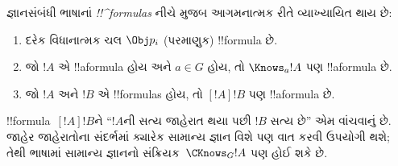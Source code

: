 \documentclass[../../../include/open-logic-section]{subfiles}
\begin{document}
\begin{defn}
  જ્ઞાનસંબંધી ભાષાનાં \emph{!!^{formula}s} નીચે મુજબ આગમનાત્મક રીતે
  વ્યાખ્યાયિત થાય છે:
  \begin{enumerate}


  \item દરેક વિધાનાત્મક ચલ $\Obj p_i$ (પરમાણુક) !!{formula} છે.






  \item જો $!A$ એ !!a{formula} હોય અને $a \in G$ હોય, તો $\Knows_a !A$
  પણ !!a{formula} છે.
  
  \item જો $!A$ અને $!B$ એ !!{formula}s હોય, તો $[!A] !B$ પણ
  !!a{formula} છે.

\end{enumerate}
\end{defn}

!!{formula}~$[!A] !B$ને ``$!A$ની સત્ય જાહેરાત થયા પછી $!B$
સત્ય છે'' એમ વાંચવાનું છે. જાહેર જાહેરાતોના સંદર્ભમાં ક્યારેક
સામાન્ય જ્ઞાન વિશે પણ વાત કરવી ઉપયોગી થશે; તેથી ભાષામાં
સામાન્ય જ્ઞાનનો સંક્રિયક~$\CKnows_G !A$ પણ હોઈ શકે છે.
\end{document}
